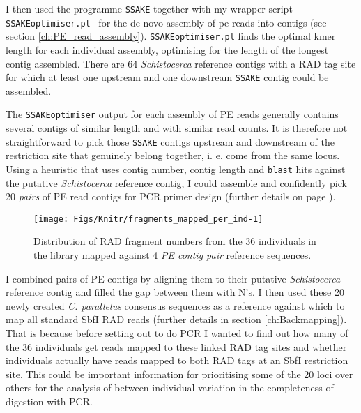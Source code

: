 \documentclass[a4paper,12pt,times,authoryear,twoside,print,index]{Classes/PhDThesisPSnPDF}\usepackage[]{graphicx}\usepackage[]{color}
\newenvironment{knitrout}{}{} %
\begin{document}
I then used the programme \texttt{SSAKE} \citep{Warren2007} together with my wrapper script \texttt{SSAKEoptimiser.pl}~ for the de novo assembly of \gls{pe} reads into contigs (see section \ref{ch:PE_read_assembly}). \texttt{SSAKEoptimiser.pl} finds the optimal \gls{kmer} length for each individual assembly, optimising for the length of the longest contig assembled. There are 64 \textit{Schistocerca} reference contigs with a \gls{RAD tag} site for which at least one upstream and one downstream \texttt{SSAKE} contig could be assembled.

The \texttt{SSAKEoptimiser} output for each assembly of PE reads generally contains several \glspl{contig} of similar length and with similar read counts. It is therefore not straightforward to pick those \texttt{SSAKE} contigs upstream and downstream of the restriction site that genuinely belong together, i. e. come from the same locus. Using a heuristic that uses contig number, contig length and \texttt{blast} hits against the putative \textit{Schistocerca} reference contig, I could assemble and confidently pick 20 \emph{pairs} of PE read contigs for PCR primer design (further details on page \pageref{ch:picking_right_contig}). 
%
\begin{figure}
\begin{knitrout}
\color{fgcolor}

{\centering \texttt{[image: Figs/Knitr/fragments\_mapped\_per\_ind-1]} 

}



\end{knitrout}
\caption{Distribution of RAD \gls{fragment} numbers from the 36 individuals in the library mapped against 4 \emph{PE contig pair} reference sequences.}
\label{fragments-mapped-per-ind}
\end{figure}
%

I combined pairs of PE contigs by aligning them to their putative \textit{Schistocerca} reference contig and filled the gap between them with N's. I then used these 20 newly created \textit{C. parallelus} consensus sequences as a reference against which to map all standard SbfI RAD reads (further details in section \ref{ch:Backmapping}). That is because before setting out to do PCR I wanted to find out how many of the 36 individuals get reads mapped to these \glspl{linked RAD tag site} and whether individuals actually have reads mapped to both \glspl{RAD tag} at an SbfI restriction site. This could be important information for prioritising some of the 20 loci over others for the analysis of between individual variation in the completeness of digestion with PCR.
\end{document}
